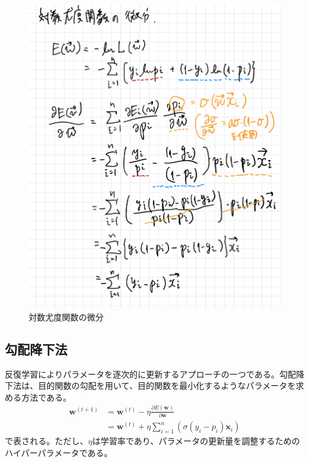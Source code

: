 \documentclass{ltjsarticle}
\begin{document}
\begin{figure}[htbp]
  \centering
  \includegraphics[width=13cm]{capture/対数尤度関数の微分.png}
  \caption{対数尤度関数の微分}
\end{figure}

\newpage

\subsection{勾配降下法}
反復学習によりパラメータを逐次的に更新するアプローチの一つである。勾配降下法は、目的関数の勾配を用いて、目的関数を最小化するようなパラメータを求める方法である。
\begin{align}
  \boldsymbol{w}^{(t+1)} &= \boldsymbol{w}^{(t)} - \eta \frac{\partial E(\boldsymbol{w})}{\partial \boldsymbol{w}} \\
  &= \boldsymbol{w}^{(t)} + \eta \sum^n_{i=1}(\sigma(y_i - p_i)\boldsymbol{x}_i) \label{eq:gd}
\end{align}
で表される。ただし、$\eta$は学習率であり、パラメータの更新量を調整するためのハイパーパラメータである。
\end{document}

